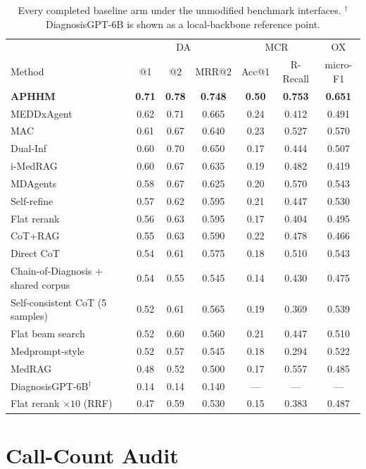 \documentclass[letterpaper]{article}
\begin{document}
\begin{table}[t]
\centering
\small
\begin{tabular}{@{}lcccccc@{}}
\toprule
& \multicolumn{3}{c}{DA} & \multicolumn{2}{c}{MCR} & OX \\
Method & @1 & @2 & MRR@2 & Acc@1 & R-Recall & micro-F1 \\
\midrule
\textbf{APHHM} & \textbf{0.71} & \textbf{0.78} & \textbf{0.748} & \textbf{0.50} & \textbf{0.753} & \textbf{0.651} \\
MEDDxAgent & 0.62 & 0.71 & 0.665 & 0.24 & 0.412 & 0.491 \\
MAC & 0.61 & 0.67 & 0.640 & 0.23 & 0.527 & 0.570 \\
Dual-Inf & 0.60 & 0.70 & 0.650 & 0.17 & 0.444 & 0.507 \\
i-MedRAG & 0.60 & 0.67 & 0.635 & 0.19 & 0.482 & 0.419 \\
MDAgents & 0.58 & 0.67 & 0.625 & 0.20 & 0.570 & 0.543 \\
Self-refine & 0.57 & 0.62 & 0.595 & 0.21 & 0.447 & 0.530 \\
Flat rerank & 0.56 & 0.63 & 0.595 & 0.17 & 0.404 & 0.495 \\
CoT+RAG & 0.55 & 0.63 & 0.590 & 0.22 & 0.478 & 0.466 \\
Direct CoT & 0.54 & 0.61 & 0.575 & 0.18 & 0.510 & 0.543 \\
Chain-of-Diagnosis + shared corpus & 0.54 & 0.55 & 0.545 & 0.14 & 0.430 & 0.475 \\
Self-consistent CoT (5 samples) & 0.52 & 0.61 & 0.565 & 0.19 & 0.369 & 0.539 \\
Flat beam search & 0.52 & 0.60 & 0.560 & 0.21 & 0.447 & 0.510 \\
Medprompt-style & 0.52 & 0.57 & 0.545 & 0.18 & 0.294 & 0.522 \\
MedRAG & 0.48 & 0.52 & 0.500 & 0.17 & 0.557 & 0.485 \\
DiagnosisGPT-6B$^{\dagger}$ & 0.14 & 0.14 & 0.140 & --- & --- & --- \\
\midrule
Flat rerank $\times 10$ (RRF) & 0.47 & 0.59 & 0.530 & 0.15 & 0.383 & 0.487 \\
\bottomrule
\end{tabular}
\caption{Every completed baseline arm under the unmodified benchmark interfaces. $^{\dagger}$DiagnosisGPT-6B is shown as a local-backbone reference point.}
\label{tab:all-baselines}
\end{table}

\section{Call-Count Audit}
\end{document}
